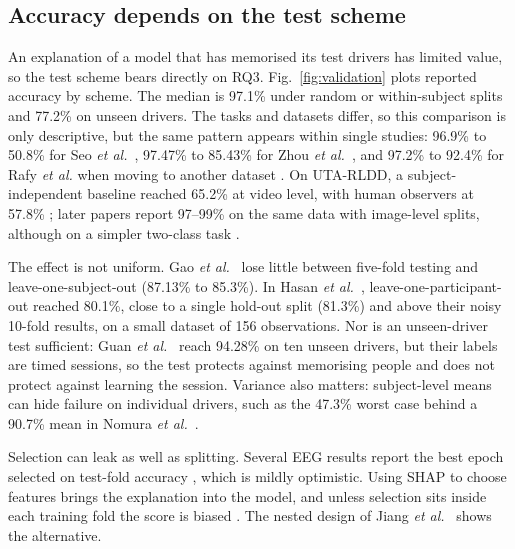 \subsection{Accuracy depends on the test scheme}
An explanation of a model that has memorised its test drivers has limited value, so the test scheme bears directly on RQ3. Fig.~\ref{fig:validation} plots reported accuracy by scheme. The median is 97.1\% under random or within-subject splits and 77.2\% on unseen drivers. The tasks and datasets differ, so this comparison is only descriptive, but the same pattern appears within single studies: 96.9\% to 50.8\% for Seo \textit{et al.}~\cite{seo2025driver}, 97.47\% to 85.43\% for Zhou \textit{et al.}~\cite{zhou2026sedriven}, and 97.2\% to 92.4\% for Rafy \textit{et al.} when moving to another dataset \cite{rafy2026domain}. On UTA-RLDD, a subject-independent baseline reached 65.2\% at video level, with human observers at 57.8\% \cite{ghoddoosian2019realistic}; later papers report 97--99\% on the same data with image-level splits, although on a simpler two-class task \cite{rafy2026domain,jewel2025lightweight}.

The effect is not uniform. Gao \textit{et al.}~\cite{gao2024sftnet} lose little between five-fold testing and leave-one-subject-out (87.13\% to 85.3\%). In Hasan \textit{et al.}~\cite{hasan2024validation}, leave-one-participant-out reached 80.1\%, close to a single hold-out split (81.3\%) and above their noisy 10-fold results, on a small dataset of 156 observations. Nor is an unseen-driver test sufficient: Guan \textit{et al.}~\cite{guan2025fatigue} reach 94.28\% on ten unseen drivers, but their labels are timed sessions, so the test protects against memorising people and does not protect against learning the session. Variance also matters: subject-level means can hide failure on individual drivers, such as the 47.3\% worst case behind a 90.7\% mean in Nomura \textit{et al.}~\cite{nomura2025drowsiness}.

Selection can leak as well as splitting. Several EEG results report the best epoch selected on test-fold accuracy \cite{cui2022eeg,cui2022compact,cui2021subject,feng2025id3rsnet}, which is mildly optimistic. Using SHAP to choose features brings the explanation into the model, and unless selection sits inside each training fold the score is biased \cite{zhu2025madfm}. The nested design of Jiang \textit{et al.}~\cite{jiang2026eeg} shows the alternative.

